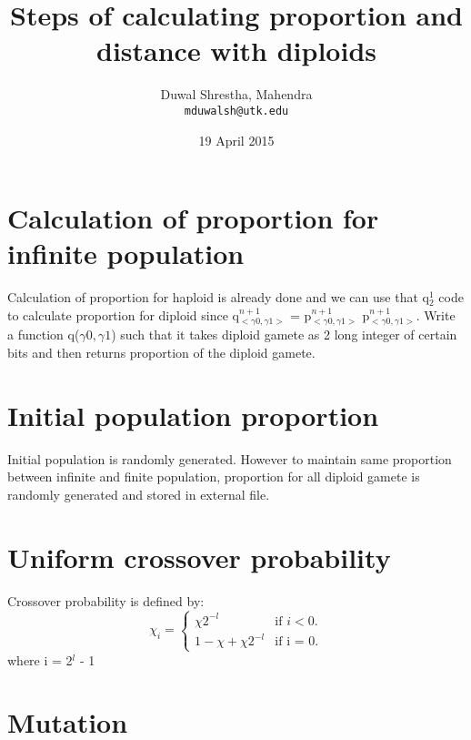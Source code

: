 \documentclass[a4paper]{article}
\title{Steps of calculating proportion and distance with diploids}
\author{
  Duwal Shrestha, Mahendra\\
  \texttt{mduwalsh@utk.edu}
  }
\date{19 April 2015}
\begin{document}
\maketitle

\section*{Calculation of proportion for infinite population}
\begin{flushleft}

Calculation of proportion for haploid is already done and we can use that q$^1_2$ code to calculate proportion for diploid since q$^{n+1}_{<\gamma0,\gamma1>}$ = p$^{n+1}_{<\gamma0,\gamma1>}$ p$^{n+1}_{<\gamma0,\gamma1>}$. 
Write a function q($\gamma0 ,\gamma1$) such that it takes diploid gamete as 2 long integer of certain bits and then returns proportion of the diploid gamete.

\end{flushleft}

\section*{Initial population proportion}
\begin{flushleft}
Initial population is randomly generated. However to maintain same proportion between infinite and finite population, proportion for all diploid gamete is randomly generated and stored in external file.
\end{flushleft}

\section*{Uniform crossover probability}
\begin{flushleft}
Crossover probability is defined by:
\linebreak
\begin{equation}
  \chi_i =\begin{cases}
    \chi2^{-l} & \text{if $i<0$}.\\
    1 - \chi + \chi2^{-l} & \text{if i = 0}.
  \end{cases}
\end{equation}
where i = 2$^l$ - 1

\end{flushleft}

\section*{Mutation}
\begin{flushleft}
\end{flushleft}
\end{document}
